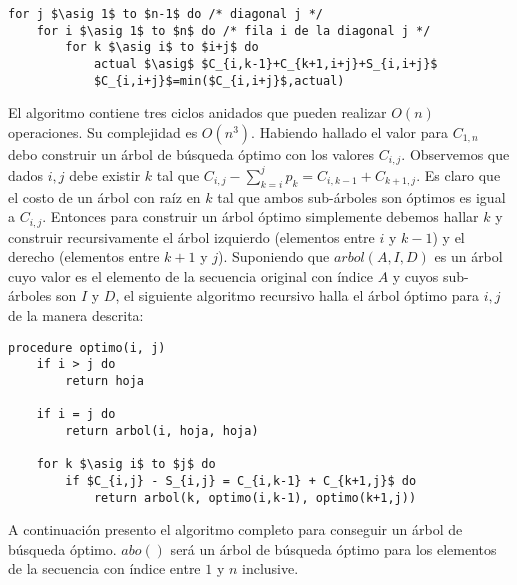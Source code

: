\documentclass{article}
\newcommand{\asig}{\ensuremath{\leftarrow}}
\begin{document}
\begin{lstlisting}[caption={Cálculo de la tabla C},label=alg:completoC]
for j $\asig 1$ to $n-1$ do /* diagonal j */
    for i $\asig 1$ to $n$ do /* fila i de la diagonal j */
        for k $\asig i$ to $i+j$ do
            actual $\asig$ $C_{i,k-1}+C_{k+1,i+j}+S_{i,i+j}$
            $C_{i,i+j}$=min($C_{i,i+j}$,actual)
\end{lstlisting}

El algoritmo contiene tres ciclos anidados que pueden realizar $O(n)$ operaciones. Su
complejidad es $O(n^3)$. Habiendo hallado el valor para $C_{1,n}$ debo construir un árbol
de búsqueda óptimo con los valores $C_{i,j}$. Observemos que dados $i, j$
debe existir $k$ tal que $C_{i,j} - \sum_{k=i}^j p_k = C_{i,k-1} + C_{k+1,j}$.
Es claro que el costo de un árbol con raíz en $k$ tal que ambos sub-árboles son óptimos es
igual a $C_{i,j}$. Entonces para construir un árbol óptimo simplemente debemos hallar $k$
y construir recursivamente el árbol izquierdo (elementos entre $i$ y $k-1$) y el derecho
(elementos entre $k+1$ y $j$). Suponiendo que $arbol(A,I,D)$ es un árbol cuyo valor es el elemento
de la secuencia original con índice $A$ y cuyos
sub-árboles son $I$ y $D$, el siguiente algoritmo recursivo halla el árbol óptimo para
$i,j$ de la manera descrita:

\begin{lstlisting}[caption={Cálculo del árbol},label=alg:arbol]
procedure optimo(i, j)
    if i > j do
        return hoja

    if i = j do
        return arbol(i, hoja, hoja)

    for k $\asig i$ to $j$ do
        if $C_{i,j} - S_{i,j} = C_{i,k-1} + C_{k+1,j}$ do
            return arbol(k, optimo(i,k-1), optimo(k+1,j))
\end{lstlisting}

A continuación presento el algoritmo completo para conseguir un árbol de búsqueda óptimo.
$abo()$ será un árbol de búsqueda óptimo para los elementos de la secuencia con índice
entre $1$ y $n$ inclusive.
\end{document}
